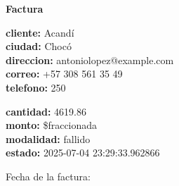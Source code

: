 \documentclass{article}
\begin{document}
\begin{center}
    {\LARGE \textbf{Factura}}\\[1cm]
\end{center}

\textbf{cliente:} Acandí \\
\textbf{ciudad:} Chocó \\
\textbf{direccion:} antoniolopez@example.com \\
\textbf{correo:} +57 308 561 35 49 \\
\textbf{telefono:} 250 \\

\vspace{0.5cm}

\textbf{cantidad:} 4619.86 \\
\textbf{monto:} \$fraccionada \\
\textbf{modalidad:} fallido \\
\textbf{estado:} 2025-07-04 23:29:33.962866 \\

\vspace{1cm}

Fecha de la factura: 
\end{document}
